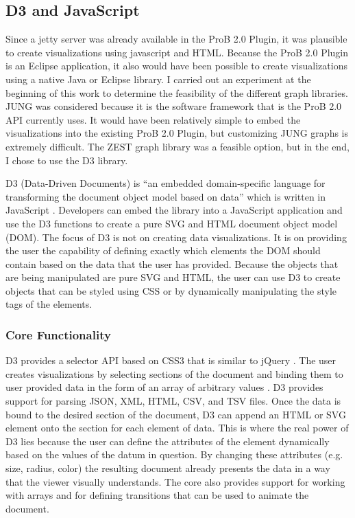 \subsection{D3 and JavaScript}

Since a jetty server was already available in the ProB 2.0 Plugin, it was plausible to create visualizations using javascript and HTML. Because the ProB 2.0 Plugin is an Eclipse application, it also would have been possible to create visualizations using a native Java or Eclipse library. I carried out an experiment at the beginning of this work to determine the feasibility of the different graph libraries. JUNG was considered because it is the software framework that is the ProB 2.0 API currently uses. It would have been relatively simple to embed the visualizations into the existing ProB 2.0 Plugin, but customizing JUNG graphs is extremely difficult. The ZEST graph library was a feasible option, but in the end, I chose to use the D3 library. 

D3 (Data-Driven Documents) is ``an embedded domain-specific language for transforming
the document object model based on data'' which is written in JavaScript \cite{2011-d3}. Developers can embed the library into a JavaScript application and use the D3 functions to create a pure SVG and HTML document object model (DOM). The focus of D3 is not on creating data visualizations. It is on providing the user the capability of defining exactly which elements the DOM should contain based on the data that the user has provided. Because the objects that are being manipulated are pure SVG and HTML, the user can use D3 to create objects that can be styled using CSS or by dynamically manipulating the style tags of the elements.

\subsubsection{Core Functionality}

D3 provides a selector API based on CSS3 that is similar to jQuery \cite{jQuery}. The user creates visualizations by selecting sections of the document and binding them to user provided data in the form of an array of arbitrary values \cite{2011-d3}. D3 provides support for parsing JSON, XML, HTML, CSV, and TSV files. Once the data is bound to the desired section of the document, D3 can append an HTML or SVG element onto the section for each element of data. This is where the real power of D3 lies because the user can define the attributes of the element dynamically based on the values of the datum in question. By changing these attributes (e.g. size, radius, color) the resulting document already presents the data in a way that the viewer visually understands. The core also provides support for working with arrays and for defining transitions that can be used to animate the document.

